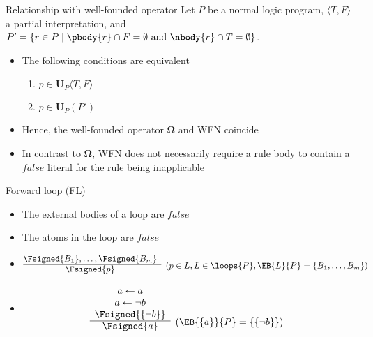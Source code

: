 \begin{frame}{Relationship with well-founded operator}
\bigskip
Let $P$ be a normal logic program,
$\langle T,F \rangle$ a partial interpretation, and\\
$P'=\{r\in P \mid \pbody{r}\cap F=\emptyset \text{ and } \nbody{r}\cap T=\emptyset\}$.\\
\bigskip
\begin{itemize}
\item <2-> The following conditions are equivalent
  \begin{enumerate}
  \item $p\in\mathbf{U}_P\langle T,F \rangle$
  \item $p\in\mathbf{U}_P(P')$
  \end{enumerate}
  \medskip
\item<3-> Hence, the well-founded operator $\mathbf{\Omega}$ and WFN coincide
\item<4->  In contrast to $\mathbf{\Omega}$, WFN does not necessarily require a rule
  body to contain a $\mathit{false}$ literal for the rule being inapplicable
\end{itemize}
\end{frame}
\begin{frame}{Forward loop (FL)}

\begin{itemize}
\item {} The external bodies of a loop are $\mathit{false}$
\item {} The atoms in the loop are $\mathit{false}$
\item {}
\[
\begin{array}{@{}cl}
\Fsigned{B_1},\dots,\Fsigned{B_m} &
\raisebox{-8pt}[0pt][0pt]{($p \in L, L \in \loops{P}, \EB{L}{P}=\{B_1,\dots,B_m\}$)}
\\\cline{1-1}
\Fsigned{p}
\end{array}
\]
\item<2-> 
\[
\begin{array}{cl}
a \leftarrow a \\
a \leftarrow \neg b \\
\Fsigned{\{\neg b\}} &
\raisebox{-8pt}[0pt][0pt]{($\EB{\{a\}}{P}=\{\{\neg b\}\}$)}
\\\cline{1-1}
\Fsigned{a}
\end{array}
\]
\end{itemize}
\end{frame}
